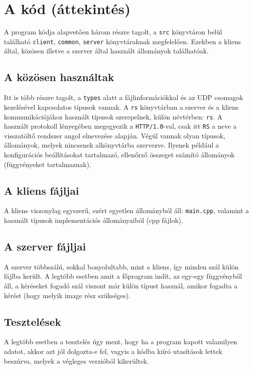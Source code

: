 \documentclass[fleqn,10pt,a4paper,titlepage]{article}
\begin{document}
  \section{A kód (áttekintés)}
  A program kódja alapvetően három részre tagolt, a \texttt{src} könyvtáron belül található \texttt{client},
  \texttt{common}, \texttt{server} könyvtáraknak megfelelően. Ezekben a kliens által, közösen illetve a szerver által
  használt állományok találhatóak.


  \subsection{A közösen használtak}
  Itt is több részre tagolt, a \texttt{types} alatt a fájlinformációkkal és az UDP csomagok kezelésével
  kapcsolatos típusok vannak. A \texttt{rs} könyvtárban a szerver és a kliens kommunikációjához használt típusok
  szerepelnek, külön névtérben: \texttt{rs}. A használt protokoll lényegében megegyezik a \texttt{HTTP/1.0}-val, csak
  itt \texttt{RS} a neve a visszatöltő rendszer angol elnevezése alapján. Végül vannak olyan típusok, állományok, melyek
  nincsenek alkönyvtárba szervezve. Ilyenek például a konfigurációs beállításokat tartalmazó, ellenőrző összeget számító
  állományok (függvényeket tartalmaznak).
  
  \subsection{A kliens fájljai}
  A kliens viszonylag egyszerű, ezért egyetlen állományból áll: \texttt{main.cpp}, valamint a használt típusok
  implementációs állományaiból (cpp fájlok).

  \subsection{A szerver fájljai}
  A szerver többszálú, sokkal bonyolultabb, mint a kliens, így minden szál külön fájlba került. A legtöbb esetben amit a
  főprogram indít, az egy-egy függvényből áll, a kéréseket fogadó szál viszont már külön típust használ, amikor fogadta
  a kérést (hogy melyik image rész szükséges).
  
  \subsection{Tesztelések}
  A legtöbb esetben a tesztelés úgy ment, hogy ha a program kapott valamilyen adatot, akkor azt jól dolgozta-e fel,
  vagyis a kódba kiíró utasítások lettek beszúrva, melyek a végleges verzióból kikerültek.
  
\end{document}
